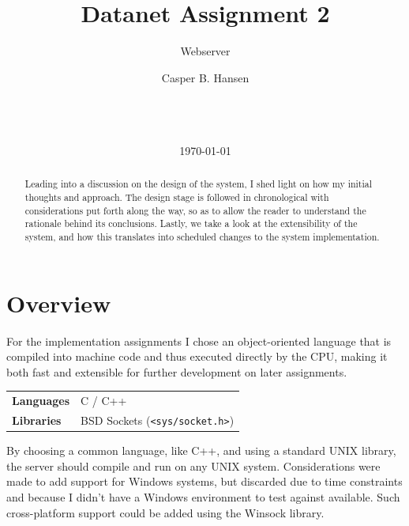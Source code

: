 \documentclass{acm_proc_article-sp}
\newcommand{\code}[1]{{\tt #1}}
\begin{document}
\title{Datanet Assignment 2}
\subtitle{Webserver}

\author{
    \alignauthor
    Casper B. Hansen\\
    \\
    \\
    \\
}

\date{\today}

\maketitle
\begin{abstract}
    Leading into a discussion on the design of the system, I shed light on how
    my initial thoughts and approach. The design stage is followed in
    chronological with considerations put forth along the way, so as to allow
    the reader to understand the rationale behind its conclusions. Lastly, we
    take a look at the extensibility of the system, and how this translates
    into scheduled changes to the system implementation.
\end{abstract}



\section{Overview}
\label{sec:overview}
For the implementation assignments I chose an object-oriented language that
is compiled into machine code and thus executed directly by the CPU, making it
both fast and extensible for further development on later assignments.

\begin{tabular}{ll}
    {\bf Languages}     & C / C++ \\
    {\bf Libraries}     & BSD Sockets (\code{<sys/socket.h>}) \\
\end{tabular}

By choosing a common language, like C++, and using a standard UNIX library,
the server should compile and run on any UNIX system. Considerations were made
to add support for Windows systems, but discarded due to time constraints and
because I didn't have a Windows environment to test against available. Such
cross-platform support could be added using the Winsock library.
\end{document}
